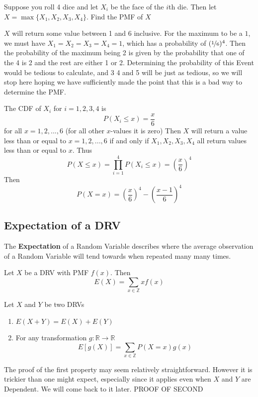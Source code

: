 \begin{example}
    Suppose you roll 4 dice and let $X_i$ be the face of the $i$th die. Then let $X=\max\{X_1, X_2, X_3, X_4\}$. Find the PMF of $X$

    $X$ will return some value between 1 and 6 inclusive. For the maximum to be a $1$, we must have $X_1=X_2=X_3=X_4=1$, which has a probability of $(\nicefrac 1 6)^4$. Then the probability of the maximum being 2 is given by the probability that one of the 4 is 2 and the rest are either 1 or 2. Determining the probability of this Event would be tedious to calculate, and 3 4 and 5 will be just as tedious, so we will stop here hoping we have sufficiently made the point that this is a bad way to determine the PMF.
    
    The CDF of $X_i$ for $i=1,2,3,4$ is
    \[
        P(X_i\le x)=\frac x 6
    \]
    for all $x=1,2,...,6$ (for all other $x$-values it is zero) Then $X$ will return a value less than or equal to $x=1,2,...,6$ if and only if $X_1, X_2,X_3,X_4$ all return values less than or equal to $x$. Thus
    \[
        P(X\le x)=\prod_{i=1}^4 P(X_i\le x)=\left(\frac x 6\right)^4
    \]
    Then
    \[
        P(X=x)= \left(\frac x 6\right)^4-\left(\frac {x-1} 6\right)^4
    \]
\end{example}

\subsection{Expectation of a DRV}
\newcommand{\E}{\textup{E}}
The \textbf{Expectation} of a Random Variable describes where the average observation of a Random Variable will tend towards when repeated many many times.
\begin{definition}
Let $X$ be a DRV with PMF $f(x)$. Then
    \[
        E(X)=\sum_{x\in\mathbb Z} x f(x)
    \]
    
\end{definition}
\begin{theorem}
    Let $X$ and $Y$ be two DRVs
    \begin{enumerate}
        \item $E(X+Y)=E(X)+E(Y)$
        \item For any transformation $g:\mathbb R\to\mathbb R$
        \[
            E\left[g(X)\right] = \sum_{x\in \mathbb Z} P(X=x) g(x)
        \]
    \end{enumerate}
    The proof of the first property may seem relatively straightforward. However it is trickier than one might expect, especially since it applies even when $X$ and $Y$ are Dependent. We will come back to it later.
    \todo PROOF OF SECOND
\end{theorem}

